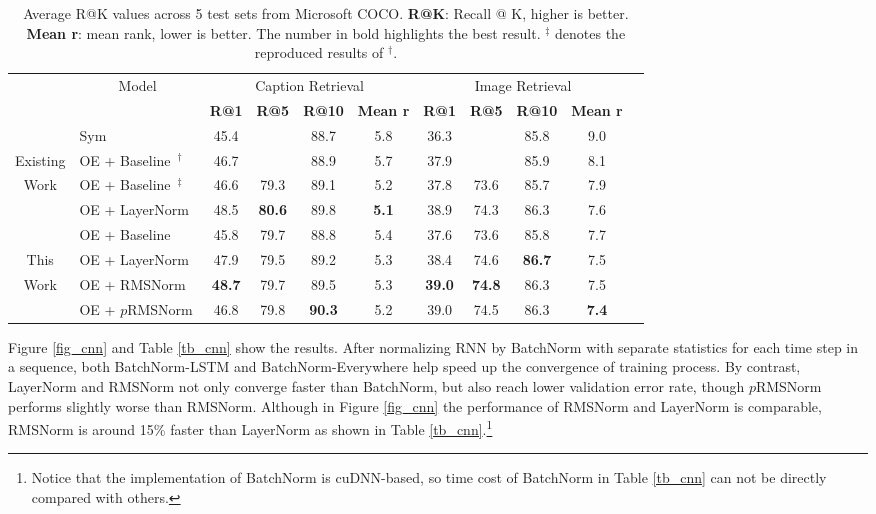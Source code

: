 \documentclass{article}
\begin{document}
\begin{table}[t]
\scriptsize
\centering
\begin{tabular}{c|l|cccc|ccccc}
& \multicolumn{1}{c|}{\multirow{2}{*}{Model}} & \multicolumn{4}{|c|}{Caption Retrieval} & \multicolumn{4}{|c}{Image Retrieval} \\
\cline{3-10}
& & \textbf{R@1} & \textbf{R@5} & \textbf{R@10} & \textbf{Mean r} & \textbf{R@1} & \textbf{R@5} & \textbf{R@10} & \textbf{Mean r} \\
\hline
\hline
    & Sym~\cite{vendrov2015order} & 45.4 & & 88.7 & 5.8 & 36.3 & & 85.8 & 9.0 \\
Existing
    & OE + Baseline~\cite{vendrov2015order}$^{\dagger}$ & 46.7 & & 88.9 & 5.7 & 37.9 & & 85.9 & 8.1 \\
Work
    & OE + Baseline~\cite{ba2016layer}$^{\ddagger}$ & 46.6 & 79.3 & 89.1 & 5.2 & 37.8 & 73.6 & 85.7 & 7.9 \\
    & OE + LayerNorm~\cite{ba2016layer} & 48.5 & \textbf{80.6} & {89.8} & \textbf{5.1} & 38.9 & 74.3 & 86.3 & 7.6 \\
\hline
\hline

    & OE + Baseline & 45.8 & 79.7 & 88.8 & 5.4 & 37.6 & 73.6 & 85.8 & 7.7 \\
{This}
    & OE + LayerNorm & 47.9 & 79.5 & 89.2 & 5.3 & 38.4 & 74.6 & \textbf{86.7} & 7.5 \\
Work
    & OE + RMSNorm & \textbf{48.7} & 79.7 & 89.5 & 5.3 & \textbf{39.0} & \textbf{74.8} & 86.3 & {7.5} \\
    & OE + $p$RMSNorm & 46.8 & 79.8 & \textbf{90.3} & 5.2 & 39.0 & 74.5 & 86.3 & \textbf{7.4} \\
\end{tabular}
\caption{\label{tb_oe} Average R@K values across 5 test sets from Microsoft COCO. \textbf{R@K}: Recall @ K, higher is better. \textbf{Mean r}: mean rank, lower is better. The number in bold highlights the best result. $^{\ddagger}$ denotes the reproduced results of $^{\dagger}$.} 
\vspace{-0.30in}
\end{table}

Figure \ref{fig_cnn} and Table \ref{tb_cnn} show the results. After normalizing RNN by BatchNorm with separate statistics for each time step in a sequence, both BatchNorm-LSTM and BatchNorm-Everywhere help speed up the convergence of training process. By contrast, LayerNorm and RMSNorm not only converge faster than BatchNorm, but also reach lower validation error rate, though $p$RMSNorm performs slightly worse than RMSNorm. Although in Figure \ref{fig_cnn} the performance of RMSNorm and LayerNorm is comparable, RMSNorm is around 15\% faster than LayerNorm as shown in Table \ref{tb_cnn}.\footnote{Notice that the implementation of BatchNorm is cuDNN-based, so time cost of BatchNorm in Table \ref{tb_cnn} can not be directly compared with others.} 
\end{document}

